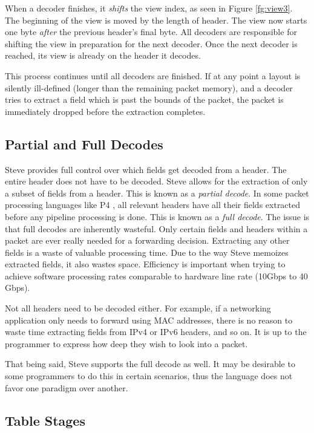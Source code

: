 When a decoder finishes, it \textit{shifts} the view index, as seen in Figure
\ref{fg:view3}. The beginning of the view is moved by the length of header.
The view now starts one byte \textit{after} the previous header's final byte. 
All decoders are responsible for shifting the view in
preparation for the next decoder. Once the next decoder is reached, its view is
already on the header it decodes.

This process continues until all decoders are finished.
If at any point a layout is silently ill-defined 
(longer than the remaining packet memory), and a decoder tries
to extract a field which is past the bounds of the packet, the packet
is immediately dropped before the extraction completes.

\subsection{Partial and Full Decodes}

Steve provides full control over which fields get decoded
from a header. The entire header does not have to be decoded.
Steve allows for the extraction of only a subset of fields from a header. 
This is known as a \emph{partial decode}.
In some packet processing languages like P4 \cite{p4_spec, p4_spec2}, all
relevant headers have all their fields extracted before any pipeline processing
is done. 
This is known as a \emph{full decode}.
The issue is that full decodes are inherently wasteful.
Only certain fields and headers within a packet are ever really needed for a
forwarding decision.
Extracting any other fields is a waste of valuable processing time.
Due to the way Steve memoizes extracted fields, it also wastes space.
Efficiency is important when trying
to achieve software processing rates comparable to hardware line rate 
(10Gbps to 40 Gbps).

Not all headers need to be decoded either. For
example, if a networking application only needs to forward using MAC addresses,
there is no reason to waste time extracting fields from IPv4 or IPv6 headers,
and so on. It is up to the programmer to express how deep they wish to look into
a packet.

That being said, Steve supports the full decode as well. It may be desirable to
some programmers to do this in certain scenarios, thus the language does not
favor one paradigm over another.

\subsection{Table Stages} \label{table_desc}


